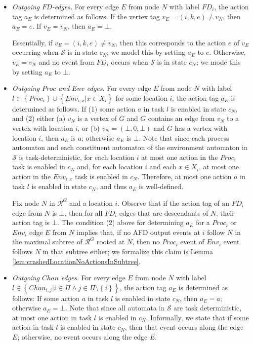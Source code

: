 \documentclass[11pt]{article}
\numberwithin{theorem}{section}
\newcommand{\set}[1]{\left\{#1\right\}}
\begin{document}
\begin{itemize}
\item
\emph{Outgoing $FD$-edges.} 
For every edge $E$ from node $N$ with label $FD_i$, the action tag
$a_E$ is determined as follows.
If the vertex tag $v_E = (i,k,e) \neq v_N$, then $a_E = e$.
If $v_E = v_N$, then $a_E = \bot$.

Essentially, if $v_E = (i,k,e) \neq v_N$, then 
this corresponds to the action $e$ of $v_E$ occurring when $\mathcal{S}$ is in state $c_N$; we model this by setting $a_E$ to $e$. Otherwise, $v_E = v_N$ and no event from $FD_i$ occurs  when $\mathcal{S}$ is in state $c_N$; we mode this by setting $a_E$ to $\bot$. 

\item
\emph{Outgoing $Proc$ and $Env$ edges.} 
For every edge $E$ from node $N$ with label $l \in \set{Proc_i} \cup \set{Env_{i,x} |x \in X_i}$ for some
location $i$, the action tag $a_E$ is determined as follows.
If (1) some action $a$ in task $l$ is enabled in state $c_N$,  and (2) either 
(a) $v_N$ is a vertex of $G$ and $G$ contains an edge from $v_N$ to a vertex with location $i$, or (b) $v_N = (\bot, 0, \bot)$ and $G$ has a vertex with location $i$, then
$a_E$ is $a$; otherwise $a_E$ is $\bot$. 
Note that since each process automaton and each constituent automaton of the environment automaton in $\mathcal{S}$ is task-deterministic, for each location $i$ at most one
action in the $Proc_i$ task is enabled in $c_N$ and, for each location $i$ and each $x \in X_i$, at most one action in the $Env_{i,x}$ task is enabled in $c_N$. Therefore, at most one action $a$ in task $l$ is enabled in state $c_N$, and thus $a_E$ is well-defined.

Fix node $N$ in $\mathcal{R}^G$ and a location $i$. Observe that if the action tag of an $FD_i$ edge from $N$ is $\bot$, then for all $FD_i$ edges that are descendants of $N$, their action tag is $\bot$. The condition (2) above for determining $a_E$ for a $Proc_i$ or $Env_i$ edge $E$ from $N$ implies that, if no AFD output events at $i$ follow $N$ in the maximal subtree of $\mathcal{R}^G$ rooted at $N$, then no $Proc_i$ event of $Env_i$ event follows $N$ in that subtree either; we formalize this claim is Lemma \ref{lem:crashedLocationNoActionsInSubtree}. 



\item
\emph{Outgoing $Chan$ edges.}
For every edge $E$ from node $N$ with label $l \in \set{Chan_{i,j} | i \in \Pi \wedge j \in \Pi \setminus \set{i}}$, the action tag $a_E$ is determined as
follows:
If some action $a$ in task $l$ is enabled in state $c_N$, then $a_E =
a$; otherwise $a_E = \bot$. 
Note that since all automata in $\mathcal{S}$ are task deterministic, at most
one action in task $l$ is enabled in $c_N$. Informally, we state that if some action in task $l$ is enabled in state $c_N$, then that event occurs along the edge $E$; otherwise, no event occurs along the edge $E$.
\end{itemize}
\end{document}
